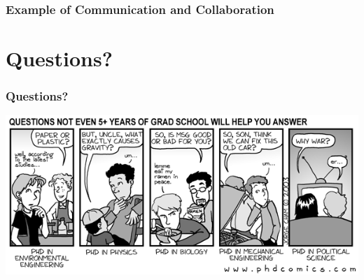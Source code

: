 \documentclass{beamer}
\begin{document}
\begin{frame} %
  \frametitle{Example of Communication and Collaboration}
  
\end{frame}

\section{Questions?} %

\begin{frame} %
 \frametitle{Questions?}
 \includegraphics[width=\textwidth]{./img/questions.png}
\end{frame}
\end{document}

